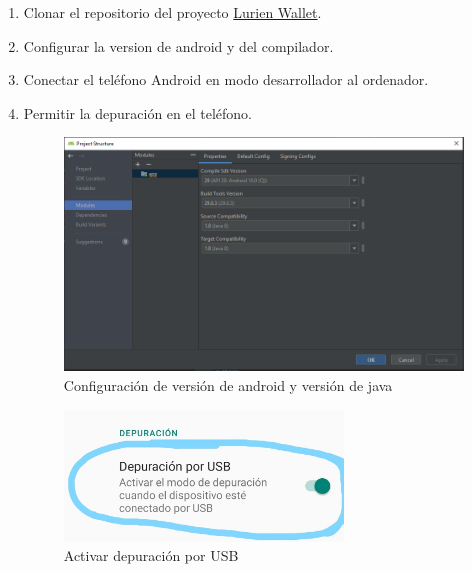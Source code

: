 \documentclass[12pt]{report}
\begin{document}
\begin{enumerate}
\item Clonar el repositorio del proyecto \href{https://github.com/ChristianTaidi/LurienWallet}{Lurien Wallet}.
\item Configurar la version de android y del compilador.

\item Conectar el teléfono Android en modo desarrollador al ordenador.

\item Permitir la depuración en el teléfono.
\begin{figure}[H]
\includegraphics[width=1\textwidth]{config-android}
\caption{Configuración de versión de android y versión de java}
\end{figure}
\begin{figure}[H]
\includegraphics[width=0.7\textwidth]{debug-android}
\caption{Activar depuración por USB}
\end{figure}


\end{enumerate}
\end{document}
